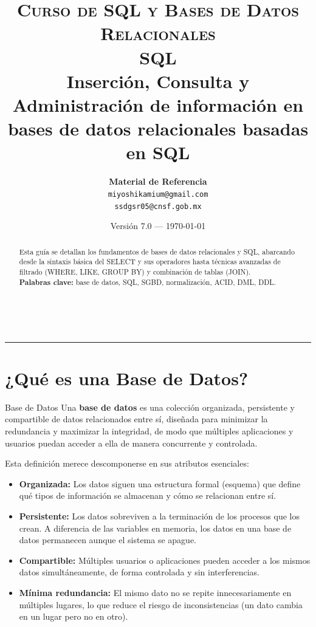 \documentclass[12pt, a4paper]{article}
\title{%
	{\large \textsc{Curso de SQL y Bases de Datos Relacionales}}\\[6pt]
	{\LARGE \textbf{SQL}}\\[4pt]
	{\large Inserción, Consulta y Administración de información en bases de datos relacionales basadas en SQL}
}
\author{%
	\textbf{Material de Referencia }\\[2pt]
	\small \texttt{miyoshikamium@gmail.com}\\
    \texttt{ssdgsr05@cnsf.gob.mx}
}
\date{\small Versión 7.0 — \today}
\begin{document}
	
	\maketitle
	\thispagestyle{fancy}
	
	\begin{abstract}
		\noindent
			Esta guía se detallan los fundamentos de bases de datos relacionales y SQL, abarcando desde la sintaxis básica del SELECT y sus operadores hasta técnicas avanzadas de filtrado (WHERE, LIKE, GROUP BY) y combinación de tablas (JOIN).\\
		\smallskip
		\textbf{Palabras clave:} base de datos, SQL, SGBD, normalización, ACID, DML, DDL.
	\end{abstract}
	\clearpage\\
	
	\tableofcontents
	\vspace{8pt}
	\hrule

	\clearpage

	\section{¿Qué es una Base de Datos?}
	
	\begin{definicion}{Base de Datos}
		Una \textbf{base de datos} es una colección organizada, persistente
		y compartible de datos relacionados entre sí, diseñada para
		minimizar la redundancia y maximizar la integridad, de modo que
		múltiples aplicaciones y usuarios puedan acceder a ella de manera
		concurrente y controlada.
	\end{definicion}
	
	Esta definición merece descomponerse en sus atributos esenciales:
	
	\begin{itemize}
		\item \textbf{Organizada:} Los datos siguen una estructura formal
		(esquema) que define qué tipos de información se almacenan y
		cómo se relacionan entre sí.
		
		\item \textbf{Persistente:} Los datos sobreviven a la terminación
		de los procesos que los crean. A diferencia de las variables en
		memoria, los datos en una base de datos permanecen aunque el
		sistema se apague.
		
		\item \textbf{Compartible:} Múltiples usuarios o aplicaciones
		pueden acceder a los mismos datos simultáneamente, de forma
		controlada y sin interferencias.
		
		\item \textbf{Mínima redundancia:} El mismo dato no se repite
		innecesariamente en múltiples lugares, lo que reduce el riesgo
		de inconsistencias (un dato cambia en un lugar pero no en otro).
	\end{itemize}
	
\end{document}
